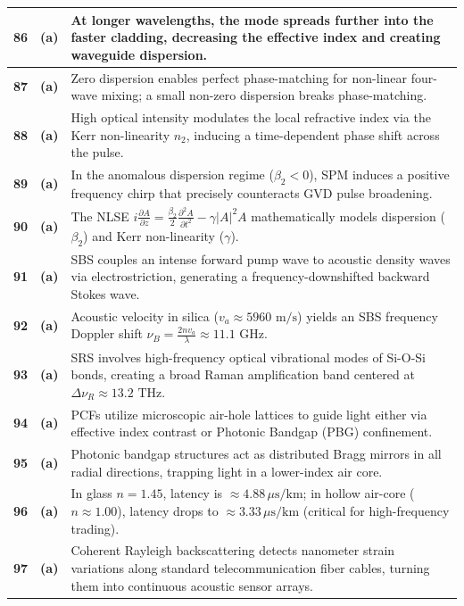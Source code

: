 {\begin{tabularx}{\textwidth}{|c|c|X|}
\textbf{86} & \textbf{(a)} & At longer wavelengths, the mode spreads further into the faster cladding, decreasing the effective index and creating waveguide dispersion. \\ \hline
\textbf{87} & \textbf{(a)} & Zero dispersion enables perfect phase-matching for non-linear four-wave mixing; a small non-zero dispersion breaks phase-matching. \\ \hline
\textbf{88} & \textbf{(a)} & High optical intensity modulates the local refractive index via the Kerr non-linearity $n_2$, inducing a time-dependent phase shift across the pulse. \\ \hline
\textbf{89} & \textbf{(a)} & In the anomalous dispersion regime ($\beta_2 < 0$), SPM induces a positive frequency chirp that precisely counteracts GVD pulse broadening. \\ \hline
\textbf{90} & \textbf{(a)} & The NLSE $i\frac{\partial A}{\partial z} = \frac{\beta_2}{2}\frac{\partial^2 A}{\partial t^2} - \gamma |A|^2 A$ mathematically models dispersion ($\beta_2$) and Kerr non-linearity ($\gamma$). \\ \hline
\textbf{91} & \textbf{(a)} & SBS couples an intense forward pump wave to acoustic density waves via electrostriction, generating a frequency-downshifted backward Stokes wave. \\ \hline
\textbf{92} & \textbf{(a)} & Acoustic velocity in silica ($v_a \approx 5960\text{ m/s}$) yields an SBS frequency Doppler shift $\nu_B = \frac{2 n v_a}{\lambda} \approx 11.1\text{ GHz}$. \\ \hline
\textbf{93} & \textbf{(a)} & SRS involves high-frequency optical vibrational modes of Si-O-Si bonds, creating a broad Raman amplification band centered at $\Delta\nu_R \approx 13.2\text{ THz}$. \\ \hline
\textbf{94} & \textbf{(a)} & PCFs utilize microscopic air-hole lattices to guide light either via effective index contrast or Photonic Bandgap (PBG) confinement. \\ \hline
\textbf{95} & \textbf{(a)} & Photonic bandgap structures act as distributed Bragg mirrors in all radial directions, trapping light in a lower-index air core. \\ \hline
\textbf{96} & \textbf{(a)} & In glass $n=1.45$, latency is $\approx 4.88\,\mu\text{s/km}$; in hollow air-core ($n \approx 1.00$), latency drops to $\approx 3.33\,\mu\text{s/km}$ (critical for high-frequency trading). \\ \hline
\textbf{97} & \textbf{(a)} & Coherent Rayleigh backscattering detects nanometer strain variations along standard telecommunication fiber cables, turning them into continuous acoustic sensor arrays. \\ \hline

\end{tabularx}}
